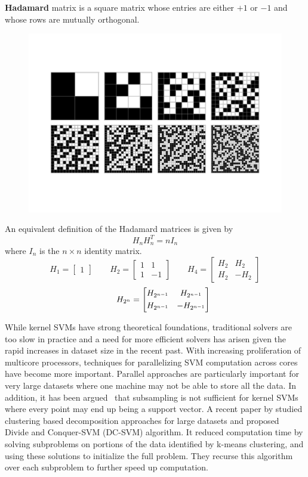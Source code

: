 	\textbf{Hadamard} matrix is a square matrix whose entries are either $+1$ or $-1$ and whose rows are mutually orthogonal.
\begin{figure}[h]
\centering
\includegraphics[width=0.7\linewidth]{HadamardMatrices_800}
\caption{}
\label{fig:HadamardMatrices_800}
\end{figure}


	An equivalent definition of the Hadamard matrices is given by 
	$$ H_{n} H_{n}^T = n  I_{n} $$
	where $I_{n}$ is the $n \times n$ identity matrix.
	$$
	H_{1} = \begin{bmatrix}
	1
	\end{bmatrix}
	\qquad
	H_{2} = \begin{bmatrix}
	1 & 1           \\[0.3em]
	1& -1
	\end{bmatrix}	
	\qquad
	H_{4} = \begin{bmatrix}
	H_{2} & H_{2}           \\[0.3em]
	H_{2}& -H_{2}
	\end{bmatrix}	
	$$
	$$
	\centering
	\qquad
	H_{2^{n}} = \begin{bmatrix}
	H_{2^{n-1}} & H_{2^{n-1}}           \\[0.3em]
	H_{2^{n-1}}& -H_{2^{n-1}}            
	\end{bmatrix}	
	$$




 
While kernel SVMs have strong theoretical foundations, traditional solvers are too slow in practice and a need for more efficient solvers has arisen given the rapid increases in dataset size in the recent past. With increasing proliferation of multicore processors, techniques for parallelizing SVM computation across cores have become more important. Parallel approaches are particularly important for very large datasets where one machine may not be able to store all the data. In addition, it has been argued~\cite{brugger2006parallel} that subsampling is not sufficient for kernel SVMs where every point may end up being a support vector. A recent paper by \cite{hsieh2013divide} studied clustering based decomposition approaches for large datasets and proposed Divide and Conquer-SVM (DC-SVM) algorithm. It reduced computation time by solving subproblems on portions of the data identified by k-means clustering, and using these solutions to initialize the full problem. They recurse this algorithm over each subproblem to further speed up computation. 

